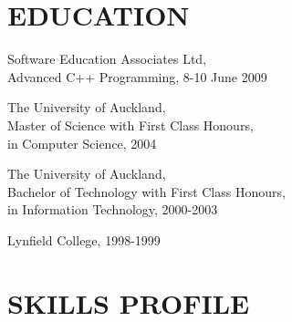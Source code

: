 \begin{resume}
\vspace{0.1in}

\section{EDUCATION}
\vspace{0.1in} 
Software Education Associates Ltd,\\
Advanced C++ Programming, 8-10 June 2009

The University of Auckland,\\
Master of Science with First Class Honours,\\
in Computer Science, 2004 
 
The University of Auckland,\\
Bachelor of Technology with First Class Honours,\\
in Information Technology, 2000-2003 
 
Lynfield College, 1998-1999 
 
\section{SKILLS PROFILE} 
\vspace{0.1in}


\end{resume}
